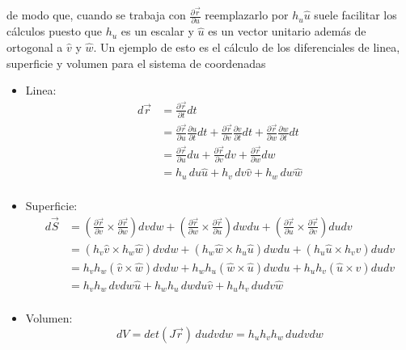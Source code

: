 de modo que, cuando se trabaja con $\frac{\partial\Vec{r}}{\partial u}$ reemplazarlo por $h_u\hat{u}$ suele facilitar los cálculos puesto que $h_u$ es un escalar y $\hat{u}$ es un vector unitario además de ortogonal a $\hat{v}$ y $\hat{w}$.
\medbreak
Un ejemplo de esto es el cálculo de los diferenciales de linea, superficie y volumen para el sistema de coordenadas
\medbreak
\begin{itemize}
    \item Linea:
    \begin{equation}
    \begin{split}
        d\Vec{r} &= \frac{\partial\Vec{r}}{\partial t}dt\\
        &= \frac{\partial\Vec{r}}{\partial u}
        \frac{\partial u}{\partial t}dt +
        \frac{\partial\Vec{r}}{\partial v}
        \frac{\partial v}{\partial t}dt +
        \frac{\partial\Vec{r}}{\partial w}
        \frac{\partial w}{\partial t}dt\\
        &= \frac{\partial\Vec{r}}{\partial u}du+
        \frac{\partial\Vec{r}}{\partial v}dv+
        \frac{\partial\Vec{r}}{\partial w}dw\\
        &= h_u\,du\hat{u}+h_v\,dv\hat{v}+h_w\,dw\hat{w}\\
    \end{split}
    \nonumber
    \end{equation}
    \item Superficie:
    \begin{equation}
    \begin{split}
        d\Vec{S} &= \left(\frac{\partial\Vec{r}}{\partial v}
        \times\frac{\partial\Vec{r}}{\partial w}\right)dvdw+
        \left(\frac{\partial\Vec{r}}{\partial w}
        \times\frac{\partial\Vec{r}}{\partial u}\right)dwdu+
        \left(\frac{\partial\Vec{r}}{\partial u}
        \times\frac{\partial\Vec{r}}{\partial v}\right)dudv\\
        &= (h_v\hat{v}\times h_w\hat{w})dvdw+
        (h_w\hat{w}\times h_u\hat{u})dwdu+
        (h_u\hat{u}\times h_v\hat{v})dudv\\
        &= h_vh_w(\hat{v}\times\hat{w})dvdw+
        h_wh_u(\hat{w}\times\hat{u})dwdu+
        h_uh_v(\hat{u}\times\hat{v})dudv\\
        &= h_vh_w\,dvdw\hat{u}+
        h_wh_u\,dwdu\hat{v}+
        h_uh_v\,dudv\hat{w}\\
    \end{split}
    \nonumber
    \end{equation}
    \item Volumen: \[dV = det(J\Vec{r})\,dudvdw = h_uh_vh_w\, dudvdw\]
\end{itemize}

